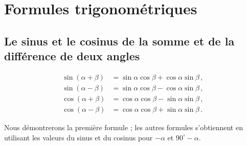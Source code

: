 
\section{Formules trigonométriques}\label{a.trig-identities}



\subsection{Le sinus et le cosinus de la somme et de la différence de deux angles} \label{s.sum-of-trig}

\begin{theorem}\label{thm.sum-of-trig}
\begin{align*}
\sin(\alpha+\beta) &= \sin\alpha\cos\beta + \cos\alpha\sin\beta\,,\\
\sin(\alpha-\beta) &= \sin\alpha\cos\beta - \cos\alpha\sin\beta\,,\\
\cos(\alpha+\beta) &= \cos\alpha\cos\beta - \sin\alpha\sin\beta\,,\\
\cos(\alpha-\beta) &= \cos\alpha\cos\beta + \sin\alpha\sin\beta\,.
\end{align*}
\end{theorem}
Nous démontrerons la première formule ; les autres formules s'obtiennent en utilisant les valeurs du sinus et du cosinus pour $-\alpha$ et $90^\circ-\alpha$.


